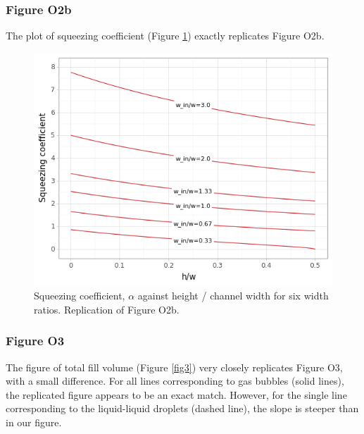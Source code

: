 \subsubsection{Figure O2b}

The plot of squeezing coefficient (Figure \ref{fig2b}) exactly replicates Figure O2b.

\begin{figure}[ht]
  \centering
  \includegraphics[width=0.8\linewidth]{../figures/fig_2b.png}
  \caption{Squeezing coefficient, $\alpha$ against height / channel width
  for six width ratios. Replication of Figure O2b.}
  \label{fig2b}
\end{figure}

\subsubsection{Figure O3}

The figure of total fill volume (Figure \ref{fig3}) very closely replicates Figure O3, with a small
difference. For all lines corresponding to gas bubbles (solid lines), the replicated figure appears to be
an exact match. However, for the single line corresponding to the liquid-liquid droplets (dashed line), the
slope is steeper than in our figure.

